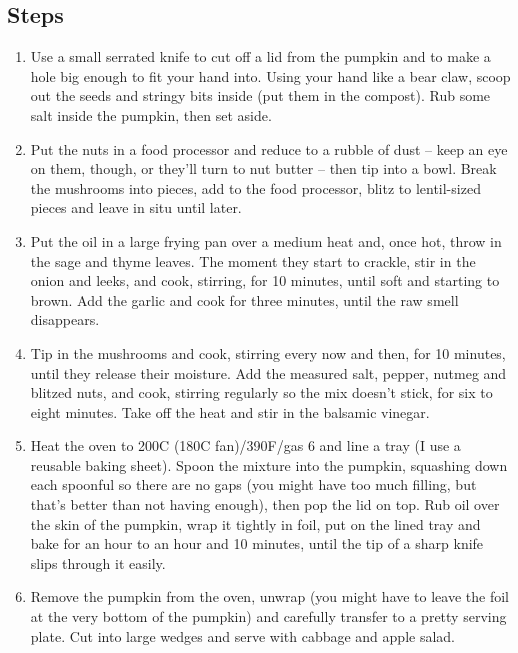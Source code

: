 \documentclass{book}
\begin{document}
\subsection*{Steps}
\begin{enumerate}
\item Use a small serrated knife to cut off a lid from the pumpkin and to make a hole big enough to fit your hand into. Using your hand like a bear claw, scoop out the seeds and stringy bits inside (put them in the compost). Rub some salt inside the pumpkin, then set aside.
\item Put the nuts in a food processor and reduce to a rubble of dust – keep an eye on them, though, or they’ll turn to nut butter – then tip into a bowl. Break the mushrooms into pieces, add to the food processor, blitz to lentil-sized pieces and leave in situ until later.
\item Put the oil in a large frying pan over a medium heat and, once hot, throw in the sage and thyme leaves. The moment they start to crackle, stir in the onion and leeks, and cook, stirring, for 10 minutes, until soft and starting to brown. Add the garlic and cook for three minutes, until the raw smell disappears.
\item Tip in the mushrooms and cook, stirring every now and then, for 10 minutes, until they release their moisture. Add the measured salt, pepper, nutmeg and blitzed nuts, and cook, stirring regularly so the mix doesn’t stick, for six to eight minutes. Take off the heat and stir in the balsamic vinegar.
\item Heat the oven to 200C (180C fan)/390F/gas 6 and line a tray (I use a reusable baking sheet). Spoon the mixture into the pumpkin, squashing down each spoonful so there are no gaps (you might have too much filling, but that’s better than not having enough), then pop the lid on top. Rub oil over the skin of the pumpkin, wrap it tightly in foil, put on the lined tray and bake for an hour to an hour and 10 minutes, until the tip of a sharp knife slips through it easily.
\item Remove the pumpkin from the oven, unwrap (you might have to leave the foil at the very bottom of the pumpkin) and carefully transfer to a pretty serving plate. Cut into large wedges and serve with cabbage and apple salad. 
\end{enumerate}
\newpage
\end{document}
